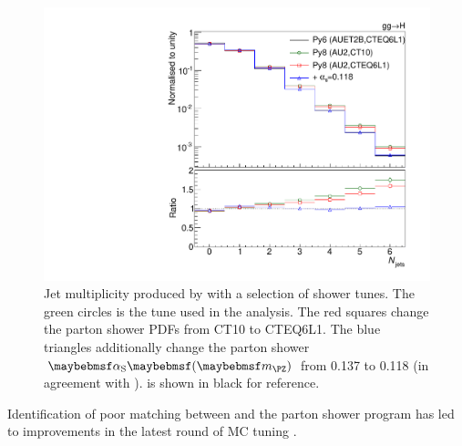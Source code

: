 \begin{figure}
	\includegraphics[width=\smallfigwidth]{tex/signal/matching}
	\caption{Jet multiplicity produced by  with a selection 
	of shower tunes. The green circles is the tune used in the analysis. The red squares 
	change the parton shower PDFs from CT10 to CTEQ6L1. The blue triangles additionally 
	change the parton shower $\alphaS\parenths{\mZ}$ from 0.137 to 0.118 (in agreement 
	with \powhegbox).  is shown in black for reference.}
	\label{fig:signal:matching}
\end{figure}

Identification of poor matching between \powhegbox and the  parton shower 
program has led to improvements in the latest round of MC tuning \cite{ATLAS:tune:2013}.
